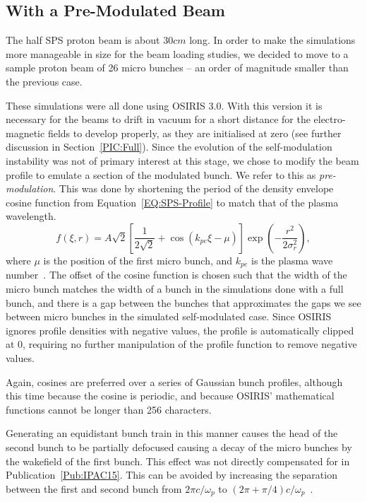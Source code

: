 \subsection{With a Pre-Modulated Beam}
\label{Sim:PBPreMod}

The half SPS proton beam is about $30\unit{cm}$ long.
In order to make the simulations more manageable in size for the beam loading studies, we decided to move to a sample proton beam of 26 micro bunches -- an order of magnitude smaller than the previous case.

These simulations were all done using OSIRIS 3.0.
With this version it is necessary for the beams to drift in vacuum for a short distance for the electro-magnetic fields to develop properly, as they are initialised at zero (see further discussion in Section~\ref{PIC:Full}).
Since the evolution of the self-modulation instability was not of primary interest at this stage, we chose to modify the beam profile to emulate a section of the modulated bunch.
We refer to this as \textit{pre-modulation}.
This was done by shortening the period of the density envelope cosine function from Equation~\ref{EQ:SPS-Profile} to match that of the plasma wavelength.
\begin{equation}
    f(\xi,r) = A\sqrt{2} \left[\frac{1}{2\sqrt{2}}
             + \cos\left(k_{pe}\xi - \mu\right)\right] \exp\left(-\frac{r^{2}}{2\sigma_{r}^{2}}\right), \label{EQ:PB-PreMod}
\end{equation}
where $\mu$ is the position of the first micro bunch, and $k_{pe}$ is the plasma wave number~\cite{berglyd_olsen:2015}.
The offset of the cosine function is chosen such that the width of the micro bunch matches the width of a bunch in the simulations done with a full bunch, and there is a gap between the bunches that approximates the gaps we see between micro bunches in the simulated self-modulated case.
Since OSIRIS ignores profile densities with negative values, the profile is automatically clipped at $0$, requiring no further manipulation of the profile function to remove negative values.

Again, cosines are preferred over a series of Gaussian bunch profiles, although this time because the cosine is periodic, and because OSIRIS' mathematical functions cannot be longer than 256 characters.

Generating an equidistant bunch train in this manner causes the head of the second bunch to be partially defocused causing a decay of the micro bunches by the wakefield of the first bunch.
This effect was not directly compensated for in Publication~\ref{Pub:IPAC15}.
This can be avoided by increasing the separation between the first and second bunch from $2\pi c/\omega_p$ to $(2\pi+\pi/4) c/\omega_p$~\cite{lotov:2018}.

